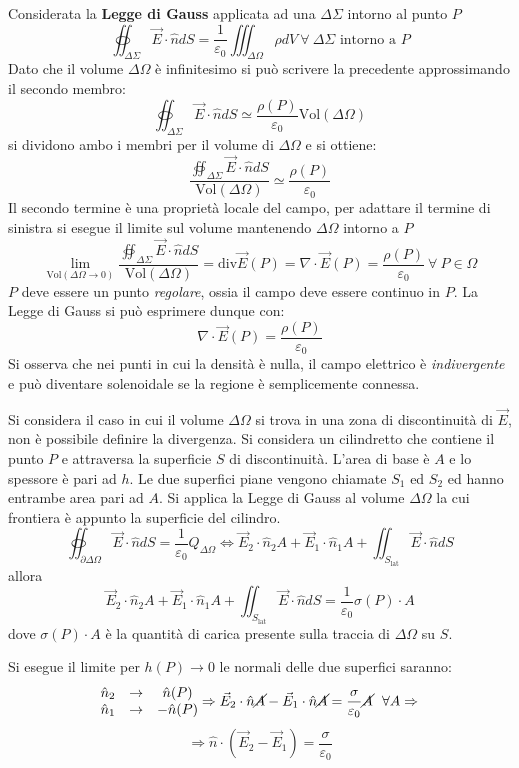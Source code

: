 Considerata la \textbf{Legge di Gauss} applicata ad una $\Delta\Sigma$ intorno al punto $P$
$$
\oiint_{\Delta\Sigma}\vec{E}\cdot\hat{n}dS = \frac{1}{\varepsilon_0} \iiint_{\Delta\Omega}\rho dV\ 
\forall\ \Delta\Sigma \text{ intorno a } P
$$
Dato che il volume $\Delta\Omega$ è infinitesimo si può scrivere la precedente approssimando il secondo
membro:
$$
\oiint_{\Delta\Sigma}\vec{E}\cdot\hat{n}dS \simeq \frac{\rho(P)}{\varepsilon_0}\text{Vol}(\Delta\Omega)
$$
si dividono ambo i membri per il volume di $\Delta\Omega$ e si ottiene:
$$
\frac{\oiint_{\Delta\Sigma}\vec{E}\cdot\hat{n}dS}{\text{Vol}(\Delta\Omega)} \simeq 
\frac{\rho(P)}{\varepsilon_0}
$$
Il secondo termine è una proprietà locale del campo, per adattare il termine di sinistra si esegue
il limite sul volume mantenendo $\Delta\Omega$ intorno a $P$
$$
\lim_{\text{Vol}(\Delta\Omega\to 0)} \frac{\oiint_{\Delta\Sigma}\vec{E}\cdot\hat{n}dS}{\text{Vol}(\Delta\Omega)} = \text{div}\vec{E}(P) = \nabla\cdot\vec{E}(P) = \frac{\rho(P)}{\varepsilon_0}\ \forall
\ P \in \Omega
$$
$P$ deve essere un punto \textit{regolare}, ossia il campo deve essere continuo in $P$.
La Legge di Gauss si può esprimere dunque con:
\begin{equation}
 \nabla\cdot\vec{E}(P) = \frac{\rho(P)}{\varepsilon_0}
 \label{eq:legge_gauss_locale}
\end{equation}
Si osserva che nei punti in cui la densità è nulla, il campo elettrico è \textit{indivergente} e
può diventare solenoidale se la regione è semplicemente connessa.

Si considera il caso in cui il volume $\Delta\Omega$ si trova in una zona di discontinuità
di $\vec{E}$, non è possibile definire la divergenza.
Si considera un cilindretto che contiene il punto $P$ e attraversa la superficie $S$ di discontinuità.
L'area di base è $A$ e lo spessore è pari ad $h$.
Le due superfici piane vengono chiamate $S_1$ ed $S_2$ ed hanno entrambe area pari ad $A$.
Si applica la Legge di Gauss al volume $\Delta\Omega$ la cui frontiera è appunto la superficie del 
cilindro.
$$
\oiint_{\partial\Delta\Omega} \vec{E}\cdot\hat{n}dS = \frac{1}{\varepsilon_0}Q_{\Delta\Omega} \Leftrightarrow \vec{E}_2\cdot\hat{n}_2A + \vec{E}_1\cdot\hat{n}_1A + 
\iint_{S_{\text{lat}}}\vec{E}\cdot\hat{n}dS
$$
allora
$$
\vec{E}_2\cdot\hat{n}_2A + \vec{E}_1\cdot\hat{n}_1A + 
\iint_{S_{\text{lat}}}\vec{E}\cdot\hat{n}dS = \frac{1}{\varepsilon_0} \sigma(P)\cdot A
$$
dove $\sigma(P)\cdot  A $ è la quantità di carica presente sulla traccia di $\Delta\Omega$ su $S$.

Si esegue il limite per $h(P)\to 0$ le normali delle due superfici saranno:
$$
\begin{matrix}
\hat{n}_2 & \to& \hat{n}(P) \\
\hat{n}_1 & \to& -\hat{n}(P)
\end{matrix}
\Rightarrow \vec{E}_2\cdot\hat{n}\cancel{A} - \vec{E}_1\cdot\hat{n}\cancel{A} = \frac{\sigma}{\varepsilon_0}\cancel{A} \ \ \forall A \Rightarrow
$$
$$
\Rightarrow \hat{n}\cdot(\vec{E}_2-\vec{E}_1) = \frac{\sigma}{\varepsilon_0}
$$

